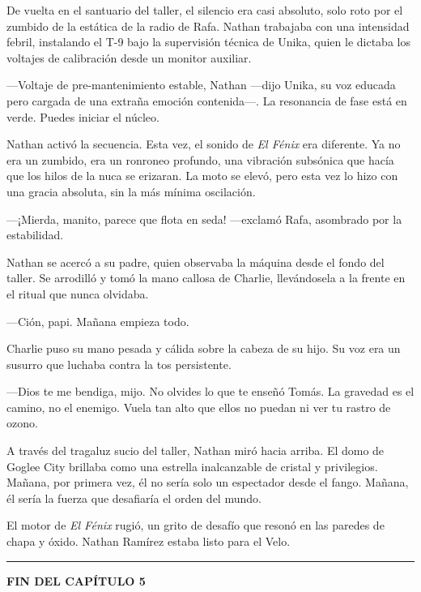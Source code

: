 \documentclass[12pt,a4paper]{book}
\begin{document}
De vuelta en el santuario del taller, el silencio era casi absoluto, solo roto por el zumbido de la estática de la radio de Rafa. Nathan trabajaba con una intensidad febril, instalando el T-9 bajo la supervisión técnica de Unika, quien le dictaba los voltajes de calibración desde un monitor auxiliar.

---Voltaje de pre-mantenimiento estable, Nathan ---dijo Unika, su voz educada pero cargada de una extraña emoción contenida---. La resonancia de fase está en verde. Puedes iniciar el núcleo.

Nathan activó la secuencia. Esta vez, el sonido de \textit{El Fénix} era diferente. Ya no era un zumbido, era un ronroneo profundo, una vibración subsónica que hacía que los hilos de la nuca se erizaran. La moto se elevó, pero esta vez lo hizo con una gracia absoluta, sin la más mínima oscilación.

---¡Mierda, manito, parece que flota en seda! ---exclamó Rafa, asombrado por la estabilidad.

Nathan se acercó a su padre, quien observaba la máquina desde el fondo del taller. Se arrodilló y tomó la mano callosa de Charlie, llevándosela a la frente en el ritual que nunca olvidaba.

---Ción, papi. Mañana empieza todo.

Charlie puso su mano pesada y cálida sobre la cabeza de su hijo. Su voz era un susurro que luchaba contra la tos persistente.

---Dios te me bendiga, mijo. No olvides lo que te enseñó Tomás. La gravedad es el camino, no el enemigo. Vuela tan alto que ellos no puedan ni ver tu rastro de ozono.

A través del tragaluz sucio del taller, Nathan miró hacia arriba. El domo de Goglee City brillaba como una estrella inalcanzable de cristal y privilegios. Mañana, por primera vez, él no sería solo un espectador desde el fango. Mañana, él sería la fuerza que desafiaría el orden del mundo.

El motor de \textit{El Fénix} rugió, un grito de desafío que resonó en las paredes de chapa y óxido. Nathan Ramírez estaba listo para el Velo.

\bigskip
\noindent\rule{\textwidth}{0.4pt}
\bigskip

\textbf{FIN DEL CAPÍTULO 5}
\end{document}
